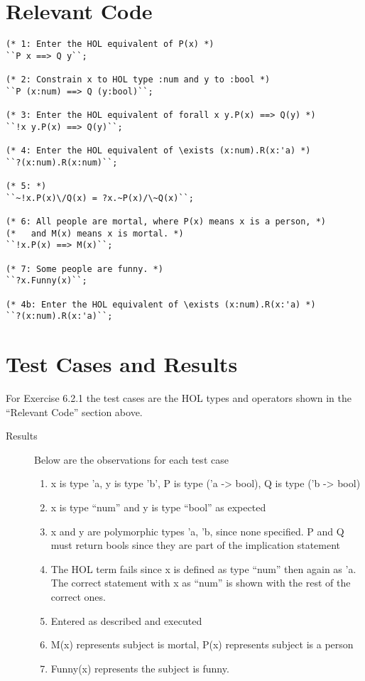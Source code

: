 \documentclass[letterpaper]{report}
\begin{document}
\section{Relevant Code}

\begin{lstlisting}
(* 1: Enter the HOL equivalent of P(x) *)
``P x ==> Q y``;

(* 2: Constrain x to HOL type :num and y to :bool *)
``P (x:num) ==> Q (y:bool)``;

(* 3: Enter the HOL equivalent of forall x y.P(x) ==> Q(y) *)
``!x y.P(x) ==> Q(y)``;

(* 4: Enter the HOL equivalent of \exists (x:num).R(x:'a) *)
``?(x:num).R(x:num)``;

(* 5: *)
``~!x.P(x)\/Q(x) = ?x.~P(x)/\~Q(x)``;

(* 6: All people are mortal, where P(x) means x is a person, *)
(*   and M(x) means x is mortal. *)
``!x.P(x) ==> M(x)``;

(* 7: Some people are funny. *)
``?x.Funny(x)``;

(* 4b: Enter the HOL equivalent of \exists (x:num).R(x:'a) *)
``?(x:num).R(x:'a)``;
\end{lstlisting}

\section{Test Cases and Results}

For Exercise 6.2.1 the test cases are the HOL types and operators shown in the ``Relevant Code'' section above.  



\begin{description}
\item[Results] Below are the observations for each test case
  \begin{enumerate}
  \item x is type 'a, y is type 'b', P is type ('a -> bool), Q is type ('b -> bool)
  \item x is type ``num'' and y is type ``bool'' as expected
  \item x and y are polymorphic types 'a, 'b, since none specified. P and Q must return bools since they are part of the implication statement
  \item The HOL term fails since x is defined as type ``num'' then again as 'a. The correct statement with x as ``num'' is shown with the rest of the correct ones.
  \item Entered as described and executed
  \item M(x) represents subject is mortal, P(x) represents subject is a person
  \item Funny(x) represents the subject is funny.
  \end{enumerate}
\end{description}
\end{document}
